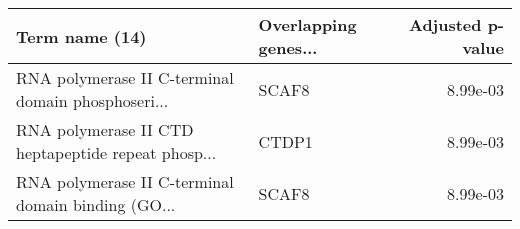 \begin{tabular}{llr}
\toprule
                                    Term name (14) & Overlapping genes... &  Adjusted p-value \\
\midrule
RNA polymerase II C-terminal domain phosphoseri... &                SCAF8 &          8.99e-03 \\
RNA polymerase II CTD heptapeptide repeat phosp... &                CTDP1 &          8.99e-03 \\
RNA polymerase II C-terminal domain binding (GO... &                SCAF8 &          8.99e-03 \\
\bottomrule
\end{tabular}
